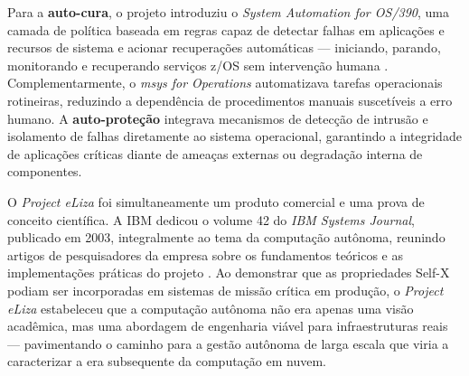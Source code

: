 Para a \textbf{auto-cura}, o projeto introduziu o \textit{System Automation for OS/390}, uma camada de política baseada em regras capaz de detectar falhas em aplicações e recursos de sistema e acionar recuperações automáticas --- iniciando, parando, monitorando e recuperando serviços z/OS sem intervenção humana \cite{ganek2003}. Complementarmente, o \textit{msys for Operations} automatizava tarefas operacionais rotineiras, reduzindo a dependência de procedimentos manuais suscetíveis a erro humano. A \textbf{auto-proteção} integrava mecanismos de detecção de intrusão e isolamento de falhas diretamente ao sistema operacional, garantindo a integridade de aplicações críticas diante de ameaças externas ou degradação interna de componentes.

O \textit{Project eLiza} foi simultaneamente um produto comercial e uma prova de conceito científica. A IBM dedicou o volume 42 do \textit{IBM Systems Journal}, publicado em 2003, integralmente ao tema da computação autônoma, reunindo artigos de pesquisadores da empresa sobre os fundamentos teóricos e as implementações práticas do projeto \cite{ganek2003}. Ao demonstrar que as propriedades Self-X podiam ser incorporadas em sistemas de missão crítica em produção, o \textit{Project eLiza} estabeleceu que a computação autônoma não era apenas uma visão acadêmica, mas uma abordagem de engenharia viável para infraestruturas reais --- pavimentando o caminho para a gestão autônoma de larga escala que viria a caracterizar a era subsequente da computação em nuvem.
